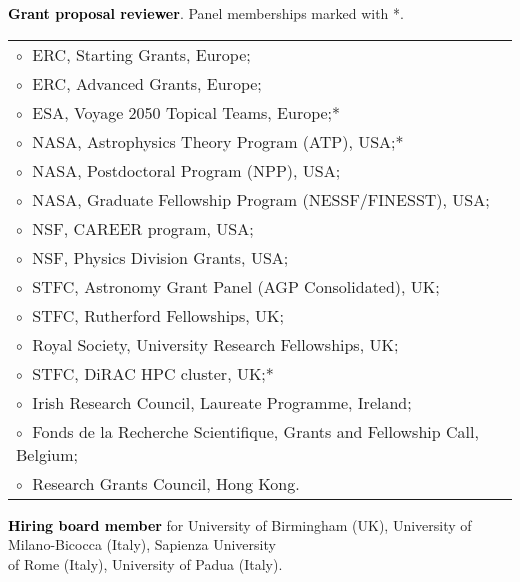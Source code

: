  \textbf{\textcolor{black}{Grant proposal reviewer}}. Panel memberships marked with *.\vspace{0.1cm}\\
\begin{tabular}{@{\hskip 0.4cm}l}
$\circ\;$ ERC, Starting Grants, Europe;\\
$\circ\;$ ERC, Advanced Grants, Europe;\\
$\circ\;$ ESA, Voyage 2050 Topical Teams, Europe;* \\
$\circ\;$ NASA, Astrophysics Theory Program (ATP), USA;* \\
$\circ\;$ NASA, Postdoctoral Program (NPP), USA;\\
$\circ\;$ NASA, Graduate Fellowship Program (NESSF/FINESST), USA; \\
$\circ\;$ NSF, CAREER program, USA;\\
$\circ\;$ NSF, Physics Division Grants, USA;\\
$\circ\;$ STFC, Astronomy Grant Panel (AGP Consolidated), UK;\\
$\circ\;$ STFC, Rutherford Fellowships, UK;\\
$\circ\;$ Royal Society, University Research Fellowships, UK;\\
$\circ\;$ STFC, DiRAC HPC cluster, UK;*\\
$\circ\;$ Irish Research Council, Laureate Programme, Ireland;\\
$\circ\;$ Fonds de la Recherche Scientifique, Grants and Fellowship Call, Belgium;\\
$\circ\;$ Research Grants Council, Hong Kong.
\end{tabular}

\vspace{0.2cm}
\textbf{\textcolor{black}{Hiring board member}} for University of Birmingham (UK), University of Milano-Bicocca (Italy), Sapienza University \\ \phantom{xx} of Rome (Italy), University of Padua (Italy). 

